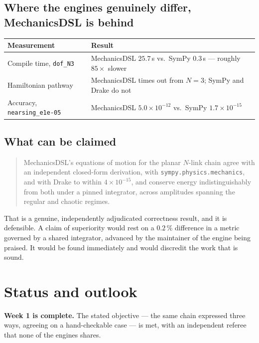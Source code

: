 \documentclass[11pt,a4paper]{article}
\begin{document}
\subsection{Where the engines genuinely differ, MechanicsDSL is behind}

\begin{center}
\begin{tabular}{@{}lL{0.55\textwidth}@{}}
\toprule
\textbf{Measurement} & \textbf{Result} \\
\midrule
Compile time, \texttt{dof\_N3} & MechanicsDSL $25.7$\,s vs.\ SymPy $0.3$\,s --- roughly $85\times$ slower \\
Hamiltonian pathway            & MechanicsDSL times out from $N=3$; SymPy and Drake do not \\
Accuracy, \texttt{nearsing\_e1e-05} & MechanicsDSL $5.0\times10^{-12}$ vs.\ SymPy $1.7\times10^{-15}$ \\
\bottomrule
\end{tabular}
\end{center}

\subsection{What can be claimed}

\begin{quote}
MechanicsDSL's equations of motion for the planar $N$-link chain agree with an
independent closed-form derivation, with \texttt{sympy.physics.mechanics}, and
with Drake to within $4\times10^{-15}$, and conserve energy indistinguishably
from both under a pinned integrator, across amplitudes spanning the regular and
chaotic regimes.
\end{quote}

\noindent That is a genuine, independently adjudicated correctness result, and
it is defensible. A claim of superiority would rest on a $0.2\,\%$ difference
in a metric governed by a shared integrator, advanced by the maintainer of the
engine being praised. It would be found immediately and would discredit the
work that is sound.

\section{Status and outlook}

\noindent\textbf{Week 1 is complete.} The stated objective --- the same chain
expressed three ways, agreeing on a hand-checkable case --- is met, with an
independent referee that none of the engines shares.
\end{document}
